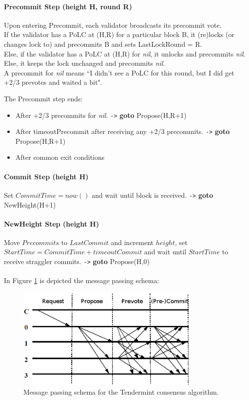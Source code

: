 \documentclass[]{article}
\newcommand{\goto}{\texttt{->} \textbf{goto}  }
\begin{document}
\paragraph{Precommit Step (height H, round R)} Upon entering Precommit, each validator broadcasts its precommit vote.\\
If the validator has a PoLC at (H,R) for a particular block B, it (re)locks (or changes lock to) and precommits B and sets LastLockRound = R.\\
Else, if the validator has a PoLC at (H,R) for \textit{nil}, it unlocks and precommits \textit{nil}.\\
Else, it keeps the lock unchanged and precommits \textit{nil}.\\
A precommit for \textit{nil} means ``I didn’t see a PoLC for this round, but I did get +2/3 prevotes and waited a bit".

The Precommit step ends:
\begin{itemize}
\item After +2/3 precommits for \textit{nil}. \goto Propose(H,R+1)
\item After timeoutPrecommit after receiving any +2/3 precommits. \goto Propose(H,R+1)
\item After common exit conditions
\end{itemize}

\paragraph{Commit Step (height H)} Set $CommitTime = now()$ and wait until block is received. \goto NewHeight(H+1)\\


\paragraph{NewHeight Step (height H)}
Move $Precommits$ to $LastCommit$ and increment $height$,
set $StartTime = CommitTime+timeoutCommit$ and wait until $StartTime$ to receive straggler commits. \goto Propose(H,0)
\\
\\
In Figure \ref{messages} is depicted the message passing schema:
\begin{figure}[h]
\centering
\includegraphics[width=0.8\textwidth]{tendermint-messages}
\caption{\label{messages} Message passing schema for the Tendermint consensus algorithm.}
\end{figure}
\\
\end{document}
